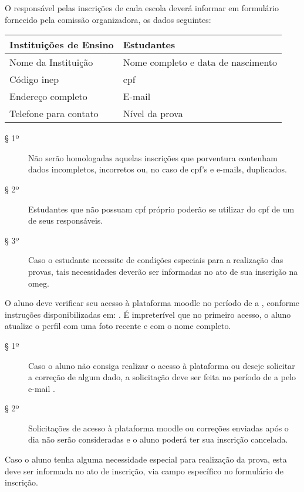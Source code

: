 \begin{article}
  O responsável pelas inscrições de cada escola deverá informar em formulário
  fornecido pela comissão organizadora, os dados seguintes:

  \begin{table}[H]
    \centering
    \begin{tabular}{l|l}
      \textbf{Instituições de Ensino} & \textbf{Estudantes}                \\ \hline
      Nome da Instituição             & Nome completo e data de nascimento \\
      Código \acrshort{inep}          & \acrshort{cpf}                     \\
      Endereço completo               & E-mail                             \\
      Telefone para contato           & Nível da prova
    \end{tabular}
  \end{table}

  \begin{description}
    \item[§ 1º]
      Não serão homologadas aquelas inscrições que porventura contenham dados
      incompletos, incorretos ou, no caso de \acrshort{cpf}'s e e-mails,
      duplicados.
    \item[§ 2º]
      Estudantes que não possuam \acrshort{cpf} próprio poderão se utilizar do
      \acrshort{cpf} de um de seus responsáveis.
    \item[§ 3º]
      Caso o estudante necessite de condições especiais para a realização das
      provas, tais necessidades deverão ser informadas no ato de sua inscrição
      na \currentEdition{} \acrshort{omeg}.
  \end{description}
\end{article}

\begin{article}
  O aluno deve verificar seu acesso à plataforma \acrshort{moodle} no período
  de \testingAccessToThePlatformOpeningDate{} a
  \testingAccessToThePlatformClosingDate, conforme instruções disponibilizadas
  em: \homepage. É impreterível que no primeiro acesso, o aluno atualize o
  perfil com uma foto recente e com o nome completo.
  \begin{description}
    \item[§ 1º]
      Caso o aluno não consiga realizar o acesso à plataforma ou deseje
      solicitar a correção de algum dado, a solicitação deve ser feita no
      período de \fixAccessCredentialsOpeningDate{} a
      \fixAccessCredentialsClosingDate{} pelo e-mail \contactUs.
    \item[§ 2º]
      Solicitações de acesso à plataforma \acrshort{moodle} ou correções
      enviadas após o dia \fixAccessCredentialsClosingDate{} não serão
      consideradas e o aluno poderá ter sua inscrição cancelada.
  \end{description}
\end{article}

\begin{article}
  Caso o aluno tenha alguma necessidade especial para realização da prova,
  esta deve ser informada no ato de inscrição, via campo específico no
  formulário de inscrição.
\end{article}
